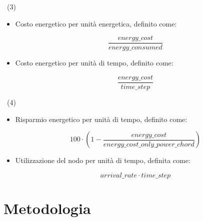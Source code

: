 \documentclass[compress]{beamer}
\begin{document}
\begin{frame}{\subsecname\ (3)}
    \begin{itemize}
        \item Costo energetico per unità energetica, definito come:
        \begin{Definition}
            \begin{equation}
                \label{eq:ce_ue}
                \frac{energy\_cost}{energy\_consumed}
            \end{equation}
        \end{Definition}
        \item Costo energetico per unità di tempo, definito come:
        \begin{Definition}
            \begin{equation}
                \label{eq:ce_ut}
                \frac{energy\_cost}{time\_step}
            \end{equation}
        \end{Definition}
    \end{itemize}
\end{frame}

\begin{frame}{\subsecname\ (4)}
    \begin{itemize}
    \item Risparmio energetico per unità di tempo, definito come:
        \begin{Definition}
            \begin{equation}
                \label{eq:re}
                100\cdot(1-\frac{energy\_cost}{energy\_cost\_only\_power\_chord})
            \end{equation}
        \end{Definition}
    \item Utilizzazione del nodo per unità di tempo, definita come:
        \begin{Definition}
            \begin{equation}
                \label{eq:utilization}
                arrival\_rate\cdot time\_step
            \end{equation}
        \end{Definition}
    \end{itemize}
\end{frame}

\section{Metodologia}
\end{document}
